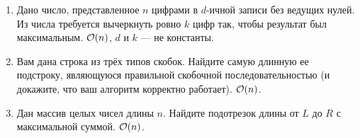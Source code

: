 \begin{enumerate}

  \item
    Дано число, представленное $n$ цифрами в $d$-ичной записи без
    ведущих нулей.  Из числа требуется вычеркнуть ровно $k$ цифр так,
    чтобы результат был максимальным. $\mathcal{O}(n)$, $d$ и $k$ --- не константы.
    
  \item {}
    Вам дана строка из трёх типов скобок. Найдите самую длинную ее
    подстроку, являющуюся правильной скобочной последовательностью
    (и докажите, что ваш алгоритм корректно работает). $\mathcal{O}(n)$.

  \item
    Дан массив целых чисел длины $n$. Найдите подотрезок длины
    от $L$ до $R$ с максимальной суммой. $\mathcal{O}(n)$.

    




\end{enumerate}
